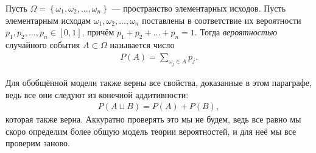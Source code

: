 \documentclass[../main.tex]{subfiles}
\begin{document}
\begin{df}
 Пусть $\Omega = \left\{ \omega_1,\omega_2, \ldots, \omega_n \right\}$ --- пространство элементарных исходов. Пусть элементарным исходам $ \omega_1, \omega_2, \ldots, \omega_n $ поставлены в соответствие их вероятности $ p_1, p_2, \ldots, p_n \in [0,1] $, причём $p_1 + p_2 + \ldots + p_n = 1$. Тогда \textit{вероятностью} случайного события $ A \subset \Omega $ называется число
 \begin{align*}
  P(A) = \sum_{\omega_j \in A} p_j
 .\end{align*}
\end{df}

Для обобщённой модели также верны все свойства, доказанные в этом параграфе, ведь все они следуют из конечной аддитивности:
\begin{align*}
 P(A \sqcup B) = P(A) + P(B),
\end{align*} которая также верна. Аккуратно проверять это мы не будем, ведь все равно мы скоро определим более общую модель теории вероятностей, и для неё мы все проверим заново.
\end{document}
